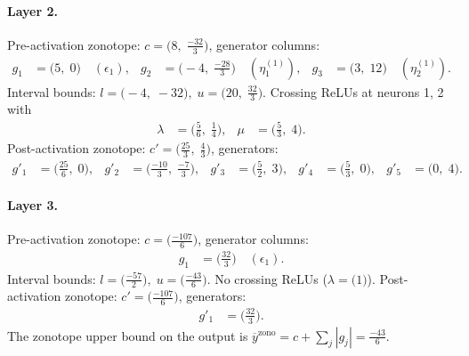 \documentclass[11pt]{article}
\begin{document}
\paragraph{Layer 2.}
Pre-activation zonotope: $c = \bigl(8,\; \frac{-32}{3}\bigr)$, generator columns:
\begin{align*}
g_{1} &= \bigl(5,\; 0\bigr) \quad (\epsilon_{1}), &
g_{2} &= \bigl(-4,\; \frac{-28}{3}\bigr) \quad (\eta^{(1)}_{1}), &
g_{3} &= \bigl(3,\; 12\bigr) \quad (\eta^{(1)}_{2}).
\end{align*}
Interval bounds: $l = \bigl(-4,\; -32\bigr), \; u = \bigl(20,\; \frac{32}{3}\bigr)$. 
Crossing ReLUs at neurons 1, 2 with
\begin{align*}
\lambda &= \bigl(\frac{5}{6},\; \frac{1}{4}\bigr), & \mu &= \bigl(\frac{5}{3},\; 4\bigr).
\end{align*}
Post-activation zonotope: $c' = \bigl(\frac{25}{3},\; \frac{4}{3}\bigr)$, generators:
\begin{align*}
g'_{1} &= \bigl(\frac{25}{6},\; 0\bigr), &
g'_{2} &= \bigl(\frac{-10}{3},\; \frac{-7}{3}\bigr), &
g'_{3} &= \bigl(\frac{5}{2},\; 3\bigr), &
g'_{4} &= \bigl(\frac{5}{3},\; 0\bigr), &
g'_{5} &= \bigl(0,\; 4\bigr).
\end{align*}
\paragraph{Layer 3.}
Pre-activation zonotope: $c = \bigl(\frac{-107}{6}\bigr)$, generator columns:
\begin{align*}
g_{1} &= \bigl(\frac{32}{3}\bigr) \quad (\epsilon_{1}).
\end{align*}
Interval bounds: $l = \bigl(\frac{-57}{2}\bigr), \; u = \bigl(\frac{-43}{6}\bigr)$. 
No crossing ReLUs ($\lambda = \bigl(1\bigr)$).
Post-activation zonotope: $c' = \bigl(\frac{-107}{6}\bigr)$, generators:
\begin{align*}
g'_{1} &= \bigl(\frac{32}{3}\bigr).
\end{align*}
The zonotope upper bound on the output is $\overline{y}^{\text{zono}} = c + \sum_j |g_j| = \frac{-43}{6}$.
\end{document}
